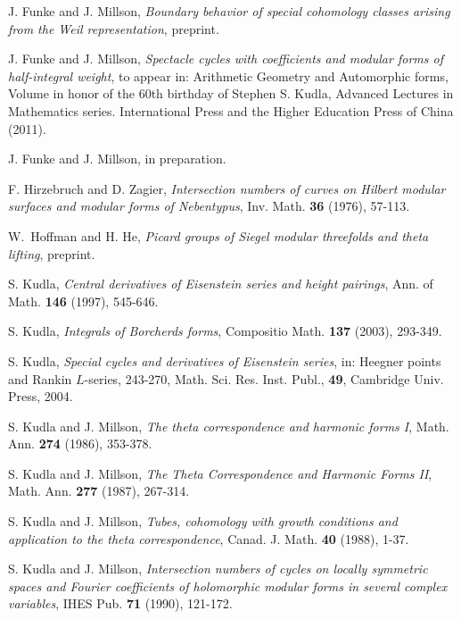 \begin{thebibliography}{99}
J. Funke and J. Millson, \emph{Boundary behavior of special cohomology classes arising from the Weil representation}, preprint. 

J. Funke and J. Millson, \emph {Spectacle cycles with coefficients and modular forms of half-integral weight}, to appear in: Arithmetic Geometry and Automorphic forms, Volume in honor of the 60th birthday of Stephen S. Kudla, Advanced Lectures in Mathematics series. International Press and the Higher Education Press of China (2011).

J. Funke and J. Millson, in preparation.


F. Hirzebruch and D. Zagier, \emph{Intersection numbers of curves on
Hilbert modular surfaces and modular forms of Nebentypus}, Inv.
Math. \textbf{36} (1976), 57-113.






W.\ Hoffman and H. He, \emph{Picard groups of Siegel modular threefolds and theta lifting}, preprint.
 

S. Kudla, \emph{Central derivatives of Eisenstein series and height
pairings}, Ann. of Math. \textbf{146} (1997), 545-646.


S. Kudla, \emph{Integrals of Borcherds forms}, Compositio Math.
\textbf{137} (2003), 293-349.

S. Kudla, \emph{Special cycles and derivatives of Eisenstein
series}, in: Heegner points and Rankin $L$-series, 243-270, Math.
Sci. Res. Inst. Publ., \textbf{49}, Cambridge Univ. Press, 2004.



S. Kudla and J. Millson, \emph{The theta correspondence and harmonic
forms I}, Math. Ann. \textbf{274} (1986), 353-378.


S. Kudla and J. Millson,
\emph{The Theta Correspondence and Harmonic Forms II},
Math. Ann. \textbf{277} (1987), 267-314.

S. Kudla and J. Millson,
\emph{Tubes, cohomology with growth
conditions and application to the theta correspondence}, Canad. J.
Math. \textbf{40} (1988), 1-37.

S. Kudla and J. Millson, \emph{Intersection numbers of cycles on
locally symmetric spaces and Fourier coefficients of holomorphic
modular forms in several complex variables}, IHES Pub. \textbf{71}
(1990), 121-172.





\end{thebibliography}
